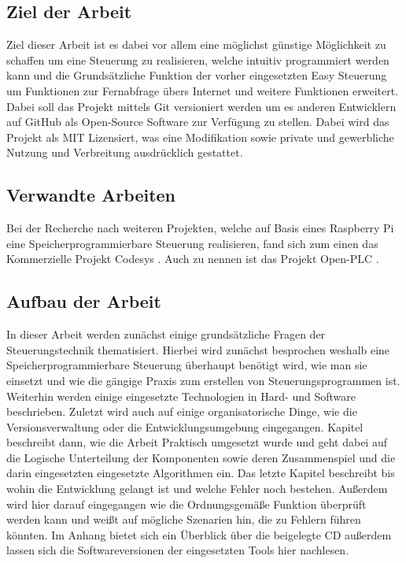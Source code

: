\subsection{Ziel der Arbeit}
Ziel dieser Arbeit ist es dabei vor allem eine möglichst günstige Möglichkeit zu schaffen um eine Steuerung zu realisieren, welche intuitiv programmiert werden kann und die Grundsätzliche Funktion der vorher eingesetzten Easy Steuerung um Funktionen zur Fernabfrage übers Internet und weitere Funktionen erweitert. Dabei soll das Projekt mittels Git versioniert werden um es anderen Entwicklern auf GitHub als Open-Source Software zur Verfügung zu stellen. Dabei wird das Projekt als MIT Lizensiert, was eine Modifikation sowie private und gewerbliche Nutzung und Verbreitung ausdrücklich gestattet. 
\subsection{Verwandte Arbeiten}
Bei der Recherche nach weiteren Projekten, welche auf Basis eines Raspberry Pi eine Speicherprogrammierbare Steuerung realisieren, fand sich zum einen das Kommerzielle Projekt Codesys \cite{URL:Codesys}. Auch zu nennen ist das Projekt Open-PLC \cite{URL:OpenPLC}. 
\subsection{Aufbau der Arbeit}
In dieser Arbeit werden zunächst einige grundsätzliche Fragen der Steuerungstechnik thematisiert. Hierbei wird zunächst besprochen weshalb eine Speicherprogrammierbare Steuerung überhaupt benötigt wird, wie man sie einsetzt und wie die gängige Praxis zum erstellen von Steuerungsprogrammen ist. Weiterhin werden einige eingesetzte Technologien in Hard- und Software beschrieben. Zuletzt wird auch auf einige organisatorische Dinge, wie die Versionsverwaltung oder die Entwicklungsumgebung eingegangen. Kapitel  beschreibt dann, wie die Arbeit Praktisch umgesetzt wurde und geht dabei auf die Logische Unterteilung der Komponenten sowie deren Zusammenspiel und die darin eingesetzten eingesetzte Algorithmen ein. Das letzte Kapitel beschreibt bis wohin die Entwicklung gelangt ist und welche Fehler noch bestehen. Außerdem wird hier darauf eingegangen wie die Ordnungsgemäße Funktion überprüft werden kann und weißt auf mögliche Szenarien hin, die zu Fehlern führen könnten. Im Anhang bietet sich ein Überblick über die beigelegte CD außerdem lassen sich die Softwareversionen der eingesetzten Tools hier nachlesen.

\clearpage
